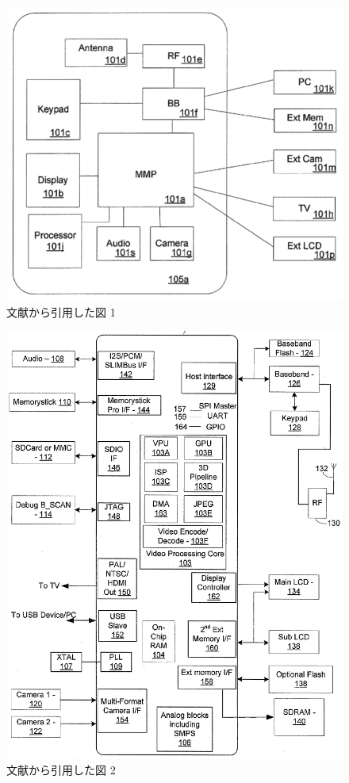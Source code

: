 \documentclass{jsarticle}
\begin{document}
\begin{figure}
\includegraphics[width=\textwidth]{vc-fig1a.png}
\caption{文献\cite{vc-patent}から引用した図 1}
\label{pic:vc-fig1a}
\end{figure}

\begin{figure}
\includegraphics[width=\textwidth]{vc-fig1b.png}
\caption{文献\cite{vc-patent}から引用した図 2}
\label{pic:vc-fig1b}
\end{figure}
\end{document}
